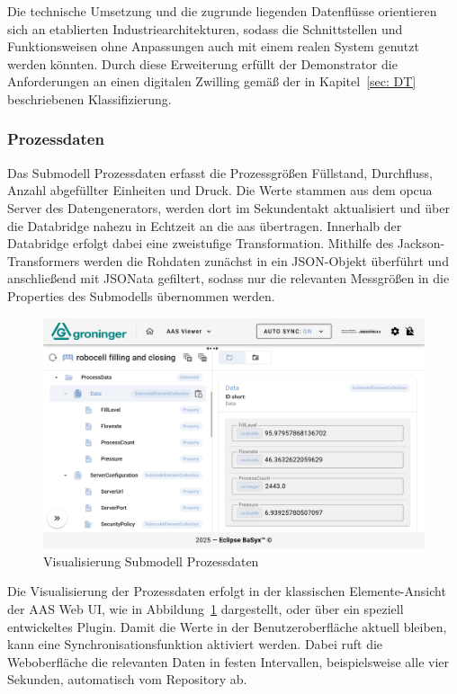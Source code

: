 Die technische Umsetzung und die zugrunde liegenden Datenflüsse orientieren sich an etablierten Industriearchitekturen, sodass die Schnittstellen und Funktionsweisen ohne Anpassungen auch mit einem realen System genutzt werden könnten.
Durch diese Erweiterung erfüllt der Demonstrator die Anforderungen an einen digitalen Zwilling gemäß der in Kapitel~\ref{sec: DT} beschriebenen Klassifizierung.

\subsubsection*{Prozessdaten}
\vspace{-0.5em}
Das Submodell Prozessdaten erfasst die Prozessgrößen Füllstand, Durchfluss, Anzahl abgefüllter Einheiten und Druck.
Die Werte stammen aus dem \acs{opcua} Server des Datengenerators, werden dort im Sekundentakt aktualisiert und über die Databridge nahezu in Echtzeit an die \acs{aas} übertragen.
Innerhalb der Databridge erfolgt dabei eine zweistufige Transformation.
Mithilfe des Jackson-Transformers werden die Rohdaten zunächst in ein JSON-Objekt überführt und anschließend mit JSONata gefiltert, sodass nur die relevanten Messgrößen in die Properties des Submodells übernommen werden.

\begin{figure}[htbp]
    \centering
    \includegraphics[width=1\textwidth]{Bilder/ErgebnisseAASWebUI/ProcessData.png}
    \caption{Visualisierung Submodell Prozessdaten}
    \label{fig:Processdata}
\end{figure}

Die Visualisierung der Prozessdaten erfolgt in der klassischen Elemente-Ansicht der AAS Web UI, wie in Abbildung~\ref{fig:Processdata} dargestellt, oder über ein speziell entwickeltes Plugin.
Damit die Werte in der Benutzeroberfläche aktuell bleiben, kann eine Synchronisationsfunktion aktiviert werden.
Dabei ruft die Weboberfläche die relevanten Daten in festen Intervallen, beispielsweise alle vier Sekunden, automatisch vom Repository ab.

